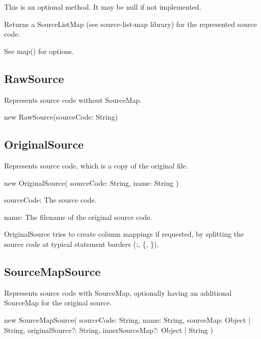 This is an optional method. It may be {\ttfamily null} if not implemented.

Returns a {\ttfamily Source\+List\+Map} (see source-\/list-\/map library) for the represented source code.

See {\ttfamily map()} for {\ttfamily options}.

\subsection*{{\ttfamily Raw\+Source}}

Represents source code without Source\+Map.


\begin{DoxyCode}
new RawSource(sourceCode: String)
\end{DoxyCode}


\subsection*{{\ttfamily Original\+Source}}

Represents source code, which is a copy of the original file.


\begin{DoxyCode}
new OriginalSource(
    sourceCode: String,
    name: String
)
\end{DoxyCode}



\begin{DoxyItemize}
\item {\ttfamily source\+Code}\+: The source code.
\item {\ttfamily name}\+: The filename of the original source code.
\end{DoxyItemize}

Original\+Source tries to create column mappings if requested, by splitting the source code at typical statement borders ({\ttfamily ;}, {\ttfamily \{}, {\ttfamily \}}).

\subsection*{{\ttfamily Source\+Map\+Source}}

Represents source code with Source\+Map, optionally having an additional Source\+Map for the original source.


\begin{DoxyCode}
new SourceMapSource(
    sourceCode: String,
    name: String,
    sourceMap: Object | String,
    originalSource?: String,
    innerSourceMap?: Object | String
)
\end{DoxyCode}



